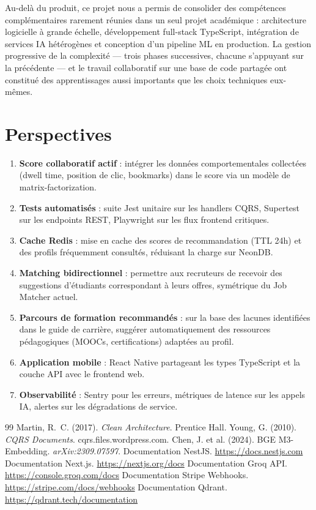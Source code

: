 ﻿\documentclass[12pt,a4paper]{report}
\begin{document}
Au-delà du produit, ce projet nous a permis de consolider des compétences complémentaires rarement réunies dans un seul projet académique : architecture logicielle à grande échelle, développement full-stack TypeScript, intégration de services IA hétérogènes et conception d'un pipeline ML en production. La gestion progressive de la complexité — trois phases successives, chacune s'appuyant sur la précédente — et le travail collaboratif sur une base de code partagée ont constitué des apprentissages aussi importants que les choix techniques eux-mêmes.

\section*{Perspectives}

\begin{enumerate}
  \item \textbf{Score collaboratif actif} : intégrer les données comportementales collectées (dwell time, position de clic, bookmarks) dans le score via un modèle de matrix-factorization.
  \item \textbf{Tests automatisés} : suite Jest unitaire sur les handlers CQRS, Supertest sur les endpoints REST, Playwright sur les flux frontend critiques.
  \item \textbf{Cache Redis} : mise en cache des scores de recommandation (TTL 24h) et des profils fréquemment consultés, réduisant la charge sur NeonDB.
  \item \textbf{Matching bidirectionnel} : permettre aux recruteurs de recevoir des suggestions d'étudiants correspondant à leurs offres, symétrique du Job Matcher actuel.
  \item \textbf{Parcours de formation recommandés} : sur la base des lacunes identifiées dans le guide de carrière, suggérer automatiquement des ressources pédagogiques (MOOCs, certifications) adaptées au profil.
  \item \textbf{Application mobile} : React Native partageant les types TypeScript et la couche API avec le frontend web.
  \item \textbf{Observabilité} : Sentry pour les erreurs, métriques de latence sur les appels IA, alertes sur les dégradations de service.
\end{enumerate}

\begin{thebibliography}{99}
 Martin, R.~C. (2017). \textit{Clean Architecture}. Prentice Hall.
 Young, G. (2010). \textit{CQRS Documents}. cqrs.files.wordpress.com.
 Chen, J. et al. (2024). BGE M3-Embedding. \textit{arXiv:2309.07597}.
 Documentation NestJS. \url{https://docs.nestjs.com}
 Documentation Next.js. \url{https://nextjs.org/docs}
 Documentation Groq API. \url{https://console.groq.com/docs}
 Documentation Stripe Webhooks. \url{https://stripe.com/docs/webhooks}
 Documentation Qdrant. \url{https://qdrant.tech/documentation}
\end{thebibliography}
\end{document}
